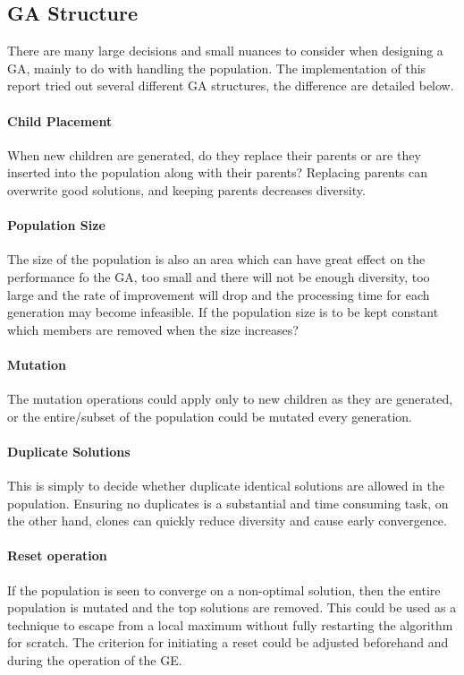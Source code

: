 \documentclass[14pt]{acmsiggraph}
\begin{document}
\subsection{GA Structure}
There are many large decisions and small nuances to consider when designing a GA, mainly to do with handling the population. The implementation of this report tried out several different GA structures, the difference are detailed below. 

\paragraph{Child Placement}
When new children are generated, do they replace their parents or are they inserted into the population along with their parents? Replacing parents can overwrite good solutions, and keeping parents decreases diversity.

\paragraph{Population Size}
The size of the population is also an area which can have great effect on the performance fo the GA, too small and there will not be enough diversity, too large and the rate of improvement will drop and the processing time for each generation may become infeasible. If the population size is to be kept constant which members are removed when the size increases?

\paragraph{Mutation}
The  mutation operations could apply only to new children as they are generated, or the entire/subset of the population could be mutated every generation.

\paragraph{Duplicate Solutions}
This is simply to decide whether duplicate identical solutions are allowed in the population. Ensuring no duplicates is a substantial and time consuming task, on the other hand, clones can quickly reduce diversity and cause early convergence.

\paragraph{Reset operation}
If the population is seen to converge on a non-optimal solution, then the entire population is mutated and the top solutions are removed. This could be  used as a technique to escape from a local maximum without fully restarting the algorithm for scratch. The criterion for initiating a reset could be adjusted beforehand and during the operation of the GE.
\end{document}
